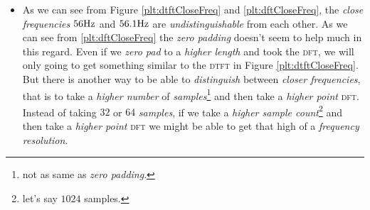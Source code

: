 \documentclass[../../course]{subfiles}
\begin{document}
\begin{itemize} [label=]
\begin{itemize} [label=]
            \item
                As we can see from Figure \ref{plt:dtftCloseFreq} and \ref{plt:dftCloseFreq}, the
                \emph{close frequencies} $\freqXTwo \si{Hz}$ and $\freqXThree \si{Hz}$ are
                \emph{undistinguishable} from each other. As we can see from \ref{plt:dftCloseFreq}
                the \emph{zero padding} doesn't seem to help much in this regard. Even if we
                \emph{zero pad} to a \emph{higher length} and took the \textsc{dft}, we will only
                going to get something similar to the \textsc{dtft} in Figure \ref{plt:dtftCloseFreq}.
                But there is another way to be able to \emph{distinguish} between \emph{closer
                frequencies}, that is to take a \emph{higher number} of \emph{samples}\footnote{not
                as same as \emph{zero padding}.} and then take a \emph{higher point} \textsc{dft}.
                Instead of taking $32$ or $64$ \emph{samples}, if we take a \emph{higher sample
                count}\footnote{let's say $1024$ samples.} and then take a \emph{higher point}
                \textsc{dft} we might be able to get that high of a \emph{frequency resolution}.

        \end{itemize}

\end{itemize}
\end{document}
